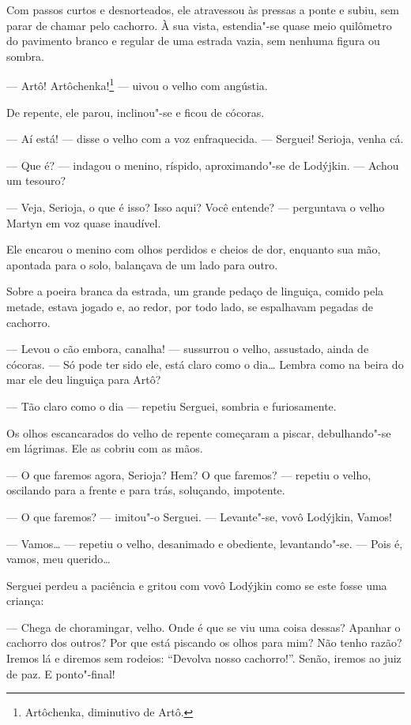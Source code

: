Com passos curtos e desnorteados, ele atravessou às pressas a ponte e
subiu, sem parar de chamar pelo cachorro. À sua vista, estendia"-se quase
meio quilômetro do pavimento branco e regular de uma estrada vazia, sem
nenhuma figura ou sombra.

--- Artô! Artôchenka!\footnote{Artôchenka, diminutivo de Artô.} ---
uivou o velho com angústia.

De repente, ele parou, inclinou"-se e ficou de cócoras.

--- Aí está! --- disse o velho com a voz enfraquecida. --- Serguei!
Serioja, venha cá.

--- Que é? --- indagou o menino, ríspido, aproximando"-se de Lodýjkin.
--- Achou um tesouro?

--- Veja, Serioja, o que é isso? Isso aqui? Você entende? --- perguntava
o velho Martyn em voz quase inaudível.

Ele encarou o menino com olhos perdidos e cheios de dor, enquanto sua
mão, apontada para o solo, balançava de um lado para outro.

Sobre a poeira branca da estrada, um grande pedaço de linguiça, comido
pela metade, estava jogado e, ao redor, por todo lado, se espalhavam
pegadas de cachorro.

--- Levou o cão embora, canalha! --- sussurrou o velho, assustado, ainda
de cócoras. --- Só pode ter sido ele, está claro como o dia\ldots{} Lembra
como na beira do mar ele deu linguiça para Artô?

--- Tão claro como o dia --- repetiu Serguei, sombria e furiosamente.

Os olhos escancarados do velho de repente começaram a piscar,
debulhando"-se em lágrimas. Ele as cobriu com as mãos.

--- O que faremos agora, Serioja? Hem? O que faremos? --- repetiu o
velho, oscilando para a frente e para trás, soluçando, impotente.

--- O que faremos? --- imitou"-o Serguei. --- Levante"-se, vovô Lodýjkin,
Vamos!

--- Vamos\ldots{} --- repetiu o velho, desanimado e obediente, levantando"-se.
--- Pois é, vamos, meu querido\ldots{}

Serguei perdeu a paciência e gritou com vovô Lodýjkin como se este fosse
uma criança:

--- Chega de choramingar, velho. Onde é que se viu uma coisa dessas?
Apanhar o cachorro dos outros? Por que está piscando os olhos para mim?
Não tenho razão? Iremos lá e diremos sem rodeios: ``Devolva nosso
cachorro!''. Senão, iremos ao juiz de paz. E ponto"-final!

